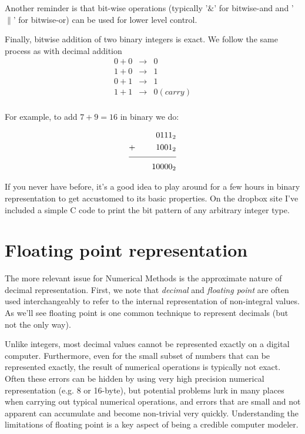 \documentclass[11pt]{article}
\begin{document}
Another reminder is that bit-wise operations (typically '$\&$' for
bitwise-and and '$\|$' for bitwise-or) can be used for lower level
control.

Finally, bitwise addition of two binary integers is exact. We follow
the same process as with decimal addition
\begin{eqnarray}
0 + 0 &\rightarrow&  0  \\ \nonumber
1 + 0 &\rightarrow&  1   \\ \nonumber
0 + 1 &\rightarrow&  1  \\ \nonumber
1 + 1 &\rightarrow&  0 (carry)  \\ \nonumber
\end{eqnarray}

For example, to add  $7+9=16$ in binary we do:

\begin{alignat*}{2}
    &&\text{0111}_{2} \\
    &+\quad& \text{1001}_{2} \\[-2\jot] \cline{1-3}
    &&\text{10000}_{2}
 \end{alignat*}

If you never have before, it's a good idea to play around for a few
hours in binary representation to get accustomed to its basic
properties. On the dropbox site I've included a simple C code to print
the bit pattern of any arbitrary integer type.

\section{Floating point representation}

The more relevant issue for Numerical Methods is the approximate
nature of decimal representation. First, we note that {\em decimal}
and {\em floating point} are often used interchangeably to refer to
the internal representation of non-integral values. As we'll see
floating point is one common technique to represent decimals (but not
the only way).

Unlike integers, most decimal values cannot be represented exactly on
a digital computer. Furthermore, even for the small subset of numbers
that can be represented exactly, the result of numerical operations is
typically not exact. Often these errors can be hidden by using very
high precision numerical representation (e.g. 8 or 16-byte), but
potential problems lurk in many places when carrying out typical
numerical operations, and errors that are small and not apparent can
accumulate and become non-trivial very quickly. Understanding the
limitations of floating point is a key aspect of being a credible
computer modeler.
\end{document}
